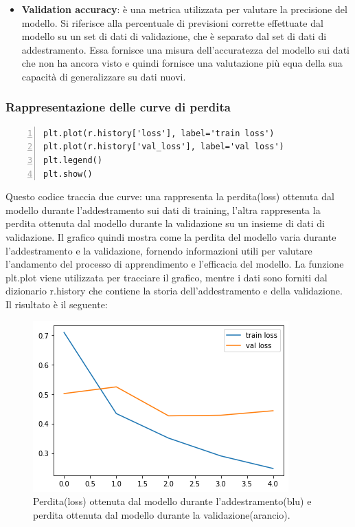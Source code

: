 \documentclass[a4paper,final,12pt]{report}
\begin{document}
\begin{itemize}
    \item \textbf{Validation accuracy}: è una metrica utilizzata per valutare la precisione del modello. Si riferisce alla percentuale di previsioni corrette effettuate dal modello su un set di dati di validazione, che è separato dal set di dati di addestramento. Essa fornisce una misura dell'accuratezza del modello sui dati che non ha ancora visto e quindi fornisce una valutazione più equa della sua capacità di generalizzare su dati nuovi.
\end{itemize}

\newpage
\subsubsection{Rappresentazione delle curve di perdita}
\begin{lstlisting}[caption={Codice per il grafico delle curve di perdita.}, label={lst:curve_perdita}, breaklines, escapechar=`\%, frame=lines, basicstyle=\small\ttfamily, keepspaces=true, numbers=left]
plt.plot(r.history['loss'], label='train loss')
plt.plot(r.history['val_loss'], label='val loss')
plt.legend()
plt.show()
\end{lstlisting}
Questo codice traccia due curve: una rappresenta la perdita(loss) ottenuta dal modello durante l'addestramento sui dati di training, l'altra rappresenta la perdita ottenuta dal modello durante la validazione su un insieme di dati di validazione. Il grafico quindi mostra come la perdita del modello varia durante l'addestramento e la validazione, fornendo informazioni utili per valutare l'andamento del processo di apprendimento e l'efficacia del modello. La funzione plt.plot viene utilizzata per tracciare il grafico, mentre i dati sono forniti dal dizionario r.history che contiene la storia dell'addestramento e della validazione. Il risultato è il seguente:
\begin{figure}[hbtp]
\centering
\includegraphics[scale=0.59]{img_concettuale/grpP.png}
\caption{Perdita(loss) ottenuta dal modello durante l'addestramento(blu) e perdita ottenuta dal modello durante la validazione(arancio).}
\end{figure}
\end{document}
